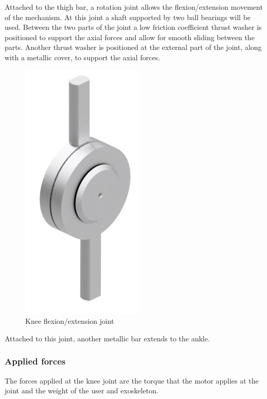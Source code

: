    Attached to the thigh bar, a rotation joint allows the flexion/extension movement of the mechanism. At this joint a shaft supported by two ball bearings will be used. Between the two parts of the joint a low friction coefficient thrust washer is positioned to support the axial forces and allow for smooth sliding between the parts. Another thrust washer is positioned at the external part of the joint, along with a metallic cover, to support the axial forces.
   
   \begin{figure}[thpb]
      \centering
      \includegraphics[scale=0.5]{Images/Junta_Joelho.jpg}
      \caption{Knee flexion/extension joint}
      \label{junta joelho}
   \end{figure}
   
   Attached to this joint, another metallic bar extends to the ankle.
   
   
   \subsubsection{Applied forces}
   
   The forces applied at the knee joint are the torque that the motor applies at the joint and the weight of the user and exoskeleton. 
   

